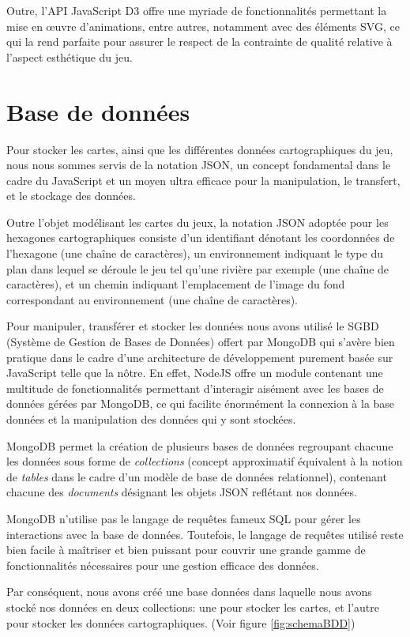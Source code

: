 \documentclass[12pt]{report}
\begin{document}
		Outre, l'API JavaScript D3 offre une myriade de fonctionnalités permettant la mise en \oe{}uvre d'animations, entre autres, notamment avec des éléments SVG, ce qui la rend parfaite pour assurer le respect de la contrainte de qualité relative à l'aspect esthétique du jeu.

    \section{Base de données}
		Pour stocker les cartes, ainsi que les différentes données cartographiques du jeu, nous nous sommes servis de la notation JSON, un concept fondamental dans le cadre du JavaScript et un moyen ultra efficace pour la manipulation, le transfert, et le stockage des données.

		Outre l'objet modélisant les cartes du jeux, la notation JSON adoptée pour les hexagones cartographiques consiste d'un identifiant dénotant les coordonnées de l'hexagone (une chaîne de caractères), un environnement indiquant le type du plan dans lequel se déroule le jeu tel qu'une rivière par exemple (une chaîne de caractères), et un chemin indiquant l'emplacement de l'image du fond correspondant au environnement (une chaîne de caractères).

		Pour manipuler, transférer et stocker les données nous avons utilisé le SGBD (Système de Gestion de Bases de Données) offert par MongoDB qui s'avère bien pratique dans le cadre d'une architecture de développement purement basée sur JavaScript telle que la nôtre. En effet, NodeJS offre un module contenant une multitude de fonctionnalités permettant d'interagir aisément avec les bases de données gérées par MongoDB, ce qui facilite énormément la connexion à la base données et la manipulation des données qui y sont stockées.

		MongoDB permet la création de plusieurs bases de données regroupant chacune les données sous forme de \textit{collections} (concept approximatif équivalent à la notion de \textit{tables} dans le cadre d'un modèle de base de données relationnel), contenant chacune des \textit{documents} désignant les objets JSON reflétant nos données.

		MongoDB n'utilise pas le langage de requêtes fameux SQL pour gérer les interactions avec la base de données. Toutefois, le langage de requêtes utilisé reste bien facile à maîtriser et bien puissant pour couvrir une grande gamme de fonctionnalités nécessaires pour une gestion efficace des données.

		Par conséquent, nous avons créé une base données dans laquelle nous avons stocké nos données en deux collections: une pour stocker les cartes, et l'autre pour stocker les données cartographiques. (Voir figure \ref{fig:schemaBDD})
\end{document}
